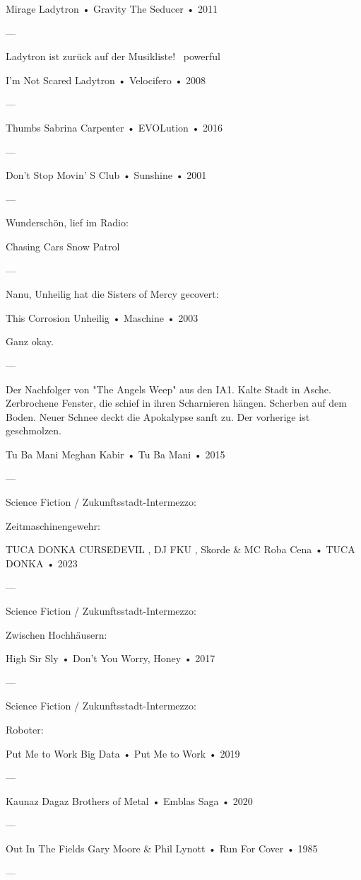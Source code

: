 Mirage
Ladytron
 •
Gravity The Seducer
 •
2011

—

Ladytron ist zurück auf der Musikliste!
~powerful~

I'm Not Scared
Ladytron
 •
Velocifero
 •
2008

—

Thumbs
Sabrina Carpenter
 •
EVOLution
 •
2016

—

Don't Stop Movin'
S Club
 •
Sunshine
 •
2001

—

Wunderschön, lief im Radio:

Chasing Cars
Snow Patrol

—

Nanu, Unheilig hat die Sisters of Mercy gecovert:

This Corrosion
Unheilig
 •
Maschine
 • 2003

Ganz okay.

—

Der Nachfolger von "The Angels Weep" aus den IA1.
Kalte Stadt in Asche.
Zerbrochene Fenster, die schief in ihren Scharnieren hängen. Scherben auf dem Boden.
Neuer Schnee deckt die Apokalypse sanft zu. Der vorherige ist geschmolzen.

Tu Ba Mani
Meghan Kabir
 •
Tu Ba Mani
 • 2015

—

Science Fiction / Zukunftsstadt-Intermezzo:

Zeitmaschinengewehr:

TUCA DONKA
CURSEDEVIL
,
DJ FKU
,
Skorde
 &
MC Roba Cena
 •
TUCA DONKA
 • 2023

—

Science Fiction / Zukunftsstadt-Intermezzo:

Zwischen Hochhäusern:

High
Sir Sly
 •
Don't You Worry, Honey
 • 2017

—

Science Fiction / Zukunftsstadt-Intermezzo:

Roboter:

Put Me to Work
Big Data
 •
Put Me to Work
 • 2019

—

Kaunaz Dagaz
Brothers of Metal
 •
Emblas Saga
 • 2020

—

Out In The Fields
Gary Moore
 &
Phil Lynott
 •
Run For Cover
 •
1985

—

